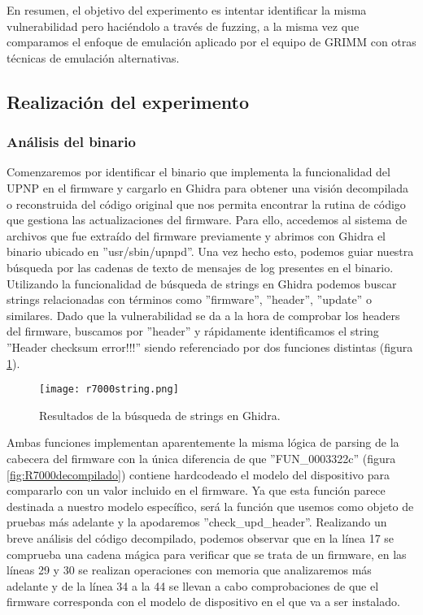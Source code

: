 En resumen, el objetivo del experimento es intentar identificar la misma vulnerabilidad pero haciéndolo a través de fuzzing, a la misma vez que comparamos el enfoque de 
emulación aplicado por el equipo de GRIMM con otras técnicas de emulación alternativas.

\subsection{Realización del experimento}
\subsubsection{Análisis del binario}
Comenzaremos por identificar el binario que implementa la funcionalidad del UPNP en el firmware y cargarlo en Ghidra\cite{Ghidra} para obtener una visión
decompilada o reconstruida del código original que nos permita encontrar la rutina de código que gestiona las actualizaciones del firmware. Para ello, 
accedemos al sistema de archivos que fue extraído del firmware previamente y abrimos con Ghidra el binario ubicado en ''usr/sbin/upnpd''. Una vez 
hecho esto, podemos guiar nuestra búsqueda por las cadenas de texto de mensajes de log presentes en el binario. Utilizando la funcionalidad de búsqueda 
de strings en Ghidra podemos buscar strings relacionadas con términos como ''firmware'', ''header'', ''update'' o similares. Dado que la vulnerabilidad 
se da a la hora de comprobar los headers del firmware, buscamos por ''header'' y rápidamente identificamos el string ''Header checksum error!!!'' 
siendo referenciado por dos funciones distintas (figura \ref{fig:R7000string}).

\begin{figure}[H]
    \centering
    \texttt{[image: r7000string.png]}
    \caption{Resultados de la búsqueda de strings en Ghidra.}
    \label{fig:R7000string}
\end{figure}

Ambas funciones implementan aparentemente la misma lógica de parsing de la cabecera del firmware con la única diferencia de que ''FUN\_0003322c''
(figura \ref{fig:R7000decompilado}) contiene hardcodeado el modelo del dispositivo para compararlo con un valor incluido en el firmware. 
Ya que esta función parece destinada a nuestro modelo específico, será la función que usemos como objeto de pruebas más adelante y la apodaremos 
''check\_upd\_header''. Realizando un breve 
análisis del código decompilado, podemos observar que en la línea 17 se comprueba una cadena mágica para verificar que se trata de un firmware, 
en las líneas 29 y 30 se realizan operaciones con memoria que analizaremos más adelante y de la línea 34 a la 44 se llevan a cabo comprobaciones de que 
el firmware corresponda con el modelo de dispositivo en el que va a ser instalado.

